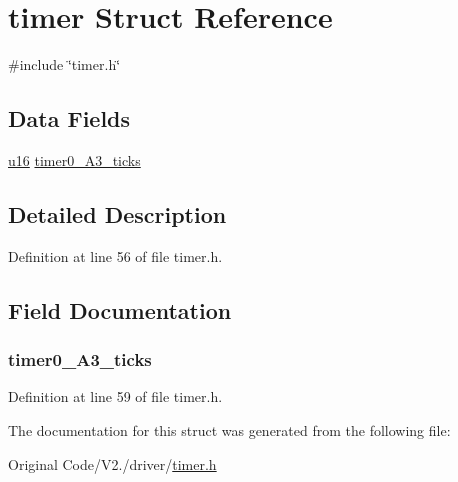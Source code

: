 \hypertarget{structtimer}{\section{timer \-Struct \-Reference}
\label{structtimer}
}


{\ttfamily \#include \char`\"{}timer.\-h\char`\"{}}

\subsection*{\-Data \-Fields}
\begin{DoxyCompactItemize}
\item 
\hyperlink{main__ED__BM_8c_a9e6c91d77e24643b888dbd1a1a590054}{u16} \hyperlink{structtimer_a7fb57440f88930f7509cf89d57fa6b97}{timer0\-\_\-\-A3\-\_\-ticks}
\end{DoxyCompactItemize}


\subsection{\-Detailed \-Description}


\-Definition at line 56 of file timer.\-h.



\subsection{\-Field \-Documentation}
\hypertarget{structtimer_a7fb57440f88930f7509cf89d57fa6b97}{
\subsubsection[{timer0\-\_\-\-A3\-\_\-ticks}]{ {\bf timer0\-\_\-\-A3\-\_\-ticks}}}\label{structtimer_a7fb57440f88930f7509cf89d57fa6b97}


\-Definition at line 59 of file timer.\-h.



\-The documentation for this struct was generated from the following file\-:\begin{DoxyCompactItemize}
\item 
\-Original Code/\-V2./driver/\hyperlink{timer_8h}{timer.\-h}\end{DoxyCompactItemize}
